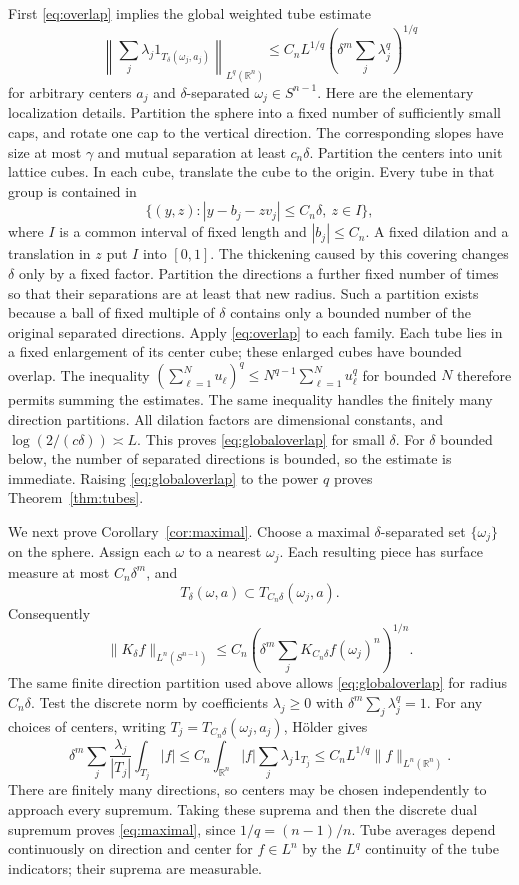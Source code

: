 \documentclass[11pt]{article}
\numberwithin{equation}{section}
\newcommand{\R}{\mathbb R}
\begin{document}
First \eqref{eq:overlap} implies the global weighted tube estimate
\begin{equation}\label{eq:globaloverlap}
 \left\|\sum_j\lambda_j1_{T_\delta(\omega_j,a_j)}
             \right\|_{L^q(\R^n)}
 \le C_n L^{1/q}
               \left(\delta^m\sum_j\lambda_j^q\right)^{1/q}
\end{equation}
for arbitrary centers $a_j$ and $\delta$-separated
$\omega_j\in S^{n-1}$.
Here are the elementary localization details.
Partition the sphere into a fixed number of sufficiently small caps,
and rotate one cap to the vertical direction.
The corresponding slopes have size at most $\gamma$ and mutual
separation at least $c_n\delta$.
Partition the centers into unit lattice cubes.
In each cube, translate the cube to the origin. Every tube in that
group is contained in
\[
 \{(y,z): |y-b_j-zv_j|\le C_n\delta,\ z\in I\},
\]
where $I$ is a common interval of fixed length and $|b_j|\le C_n$.
A fixed dilation and a translation in $z$ put $I$ into $[0,1]$.
The thickening caused by this covering changes $\delta$ only by a
fixed factor. Partition the directions a further fixed number of
times so that their separations are at least that new radius.
Such a partition exists because a ball of fixed multiple of $\delta$
contains only a bounded number of the original separated directions.
Apply \eqref{eq:overlap} to each family. Each tube lies in a fixed
enlargement of its center cube; these enlarged cubes have bounded
overlap. The inequality
$(\sum_{\ell=1}^N u_\ell)^q\le N^{q-1}\sum_{\ell=1}^N u_\ell^q$
for bounded $N$ therefore permits summing the estimates. The same
inequality handles the finitely many direction partitions.
All dilation factors are dimensional constants, and
$\log(2/(c\delta))\asymp L$. This proves
\eqref{eq:globaloverlap} for small $\delta$.
For $\delta$ bounded below, the number of separated directions is
bounded, so the estimate is immediate.
Raising \eqref{eq:globaloverlap} to the power $q$ proves
Theorem~\ref{thm:tubes}.

We next prove Corollary~\ref{cor:maximal}.
Choose a maximal $\delta$-separated set $\{\omega_j\}$ on the sphere.
Assign each $\omega$ to a nearest $\omega_j$. Each resulting piece
has surface measure at most $C_n\delta^m$, and
\[
 T_\delta(\omega,a)\subset T_{C_n\delta}(\omega_j,a).
\]
Consequently
\[
 \|K_\delta f\|_{L^n(S^{n-1})}
 \le C_n\left(\delta^m\sum_j
                  K_{C_n\delta}f(\omega_j)^n\right)^{1/n}.
\]
The same finite direction partition used above allows
\eqref{eq:globaloverlap} for radius $C_n\delta$.
Test the discrete norm by coefficients $\lambda_j\ge0$ with
$\delta^m\sum_j\lambda_j^q=1$.
For any choices of centers, writing
$T_j=T_{C_n\delta}(\omega_j,a_j)$, H\"older gives
\[
 \delta^m\sum_j\frac{\lambda_j}{|T_j|}
                  \int_{T_j}|f|
 \le C_n\int_{\R^n}|f|\sum_j\lambda_j1_{T_j}
 \le C_nL^{1/q}\|f\|_{L^n(\R^n)}.
\]
There are finitely many directions, so centers may be chosen
independently to approach every supremum. Taking these suprema and
then the discrete dual supremum proves \eqref{eq:maximal}, since
$1/q=(n-1)/n$. Tube averages depend continuously on direction and
center for $f\in L^n$ by the $L^q$ continuity of the tube indicators;
their suprema are measurable.
\end{document}
